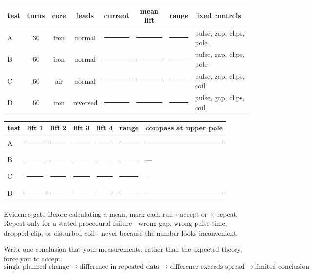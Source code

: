 \begin{center}\small
\begin{tabularx}{\linewidth}{@{}lccccccX@{}}\toprule
test & turns & core & leads & current & mean lift & range & fixed controls\\\midrule
A & 30 & iron & normal & \rule{9mm}{.4pt} & \rule{9mm}{.4pt} &
\rule{9mm}{.4pt} & pulse, gap, clips, pole\\
B & 60 & iron & normal & \rule{9mm}{.4pt} & \rule{9mm}{.4pt} &
\rule{9mm}{.4pt} & pulse, gap, clips, pole\\
C & 60 & air & normal & \rule{9mm}{.4pt} & \rule{9mm}{.4pt} &
\rule{9mm}{.4pt} & pulse, gap, clips, coil\\
D & 60 & iron & reversed & \rule{9mm}{.4pt} & \rule{9mm}{.4pt} &
\rule{9mm}{.4pt} & pulse, gap, clips, coil\\
\bottomrule\end{tabularx}
\end{center}

\begin{center}\small
\begin{tabular}{@{}lcccccl@{}}\toprule
test & lift 1 & lift 2 & lift 3 & lift 4 & range & compass at upper pole\\\midrule
A & \rule{9mm}{.4pt} & \rule{9mm}{.4pt} & \rule{9mm}{.4pt} &
\rule{9mm}{.4pt} & \rule{9mm}{.4pt} & \rule{22mm}{.4pt}\\
B & \rule{9mm}{.4pt} & \rule{9mm}{.4pt} & \rule{9mm}{.4pt} &
\rule{9mm}{.4pt} & \rule{9mm}{.4pt} & ---\\
C & \rule{9mm}{.4pt} & \rule{9mm}{.4pt} & \rule{9mm}{.4pt} &
\rule{9mm}{.4pt} & \rule{9mm}{.4pt} & ---\\
D & \rule{9mm}{.4pt} & \rule{9mm}{.4pt} & \rule{9mm}{.4pt} &
\rule{9mm}{.4pt} & \rule{9mm}{.4pt} & \rule{22mm}{.4pt}\\
\bottomrule\end{tabular}
\end{center}

\begin{telospanel}{Evidence gate}
Before calculating a mean, mark each run \(\circ\) accept or \(\times\) repeat.
Repeat only for a stated procedural failure---wrong gap, wrong pulse time,
dropped clip, or disturbed coil---never because the number looks inconvenient.
\end{telospanel}

Write one conclusion that your measurements, rather than the expected theory,
force you to accept.
\[
\boxed{\text{single planned change}}
\longrightarrow
\boxed{\text{difference in repeated data}}
\longrightarrow
\boxed{\text{difference exceeds spread}}
\longrightarrow
\boxed{\text{limited conclusion}}
\]

